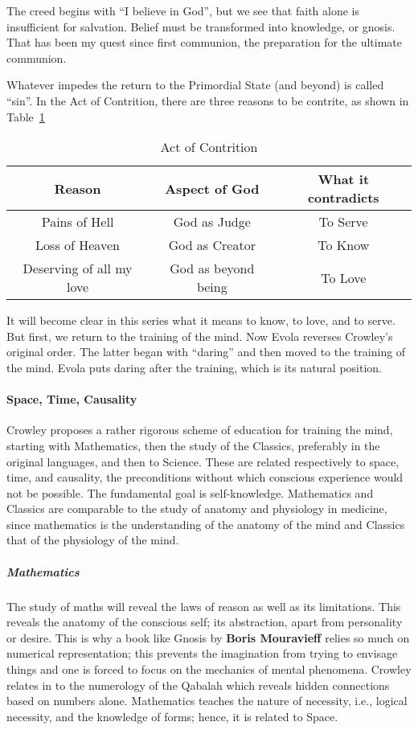 The creed begins with “I believe in God”, but we see that faith alone is insufficient for salvation. Belief must be transformed into knowledge, or gnosis. That has been my quest since first communion, the preparation for the ultimate communion.

Whatever impedes the return to the Primordial State (and beyond) is called “sin”. In the Act of Contrition, there are three reasons to be contrite, as shown in Table~\ref{tab:ActofContrition}

\begin{table}[h]\small
\centering
\label{tab:ActofContrition}
\begin{tabular}{ccc}
\toprule
\textbf{Reason} &
\textbf{Aspect of God} &
\textbf{What it contradicts}\\\midrule
Pains of Hell &
God as Judge &
To Serve\\\midrule
Loss of Heaven &
God as Creator &
To Know\\\midrule
Deserving of all my love &
God as beyond being &
To Love\\\bottomrule
\end{tabular}
\caption{Act of Contrition}
\end{table}
It will become clear in this series what it means to know, to love, and to serve. But first, we return to the training of the mind. Now Evola reverses Crowley's original order. The latter began with “daring” and then moved to the training of the mind. Evola puts daring after the training, which is its natural position.

\paragraph{Space, Time, Causality}
Crowley proposes a rather rigorous scheme of education for training the mind, starting with Mathematics, then the study of the Classics, preferably in the original languages, and then to Science. These are related respectively to space, time, and causality, the preconditions without which conscious experience would not be possible. The fundamental goal is self-knowledge. Mathematics and Classics are comparable to the study of anatomy and physiology in medicine, since mathematics is the understanding of the anatomy of the mind and Classics that of the physiology of the mind.

\subparagraph{Mathematics}
The study of maths will reveal the laws of reason as well as its limitations. This reveals the anatomy of the conscious self; its abstraction, apart from personality or desire. This is why a book like Gnosis by \textbf{Boris Mouravieff} relies so much on numerical representation; this prevents the imagination from trying to envisage things and one is forced to focus on the mechanics of mental phenomena. Crowley relates in to the numerology of the Qabalah which reveals hidden connections based on numbers alone. Mathematics teaches the nature of necessity, i.e., logical necessity, and the knowledge of forms; hence, it is related to Space.

